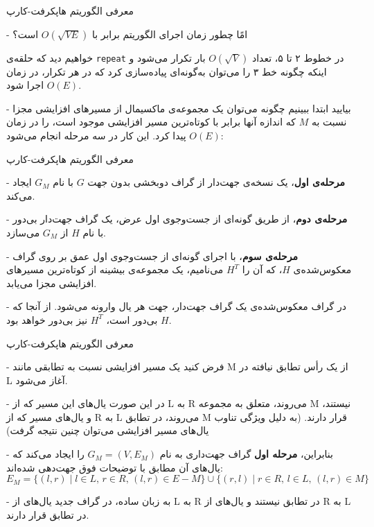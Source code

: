 \begin{itemframe}{‌معرفی الگوریتم هاپکرفت-کارپ}
\item[-]
امًا چطور زمان اجرای الگوریتم برابر با $O(\sqrt{V E})$ است؟

خواهیم دید که حلقه‌ی \texttt{repeat} در خطوط ۲ تا ۵، تعداد $O(\sqrt{V})$ بار تکرار می‌شود و اینکه چگونه خط ۳ را می‌توان به‌گونه‌ای پیاده‌سازی کرد که در هر تکرار، در زمان $O(E)$ اجرا شود.
\item[-]
بیایید ابتدا ببینیم چگونه می‌توان یک مجموعه‌ی ماکسیمال از مسیرهای افزایشی مجزا نسبت به $M$ که اندازه آنها برابر با کوتاه‌ترین مسیر افزایشی موجود است، را در زمان $O(E)$ پیدا کرد. این کار در سه مرحله انجام می‌شود:

\end{itemframe}


\begin{itemframe}{‌معرفی الگوریتم هاپکرفت-کارپ}
\item[-]
\textbf{مرحله‌ی اول}،
یک نسخه‌ی جهت‌دار از گراف دوبخشی بدون جهت $G$ با نام $G_M$ ایجاد می‌کند.
\item[-]
\textbf{مرحله‌ی دوم}،
از طریق گونه‌ای از جست‌وجوی اول عرض، یک گراف جهت‌دار بی‌دور با نام $H$ از $G_M$ می‌سازد.
\item[-]
\textbf{مرحله‌ی سوم}،
با اجرای گونه‌ای از جست‌وجوی اول عمق بر روی گراف معکوس‌شده‌ی $H$، که آن را $H^T$ می‌نامیم، یک مجموعه‌ی بیشینه از کوتاه‌ترین مسیرهای افزایشی مجزا می‌یابد.
\item[-]
در گراف معکوس‌شده‌ی یک گراف جهت‌دار، جهت هر یال وارونه می‌شود. از آنجا که $H$ بی‌دور است، $H^T$ نیز بی‌دور خواهد بود.
\end{itemframe}


\begin{itemframe}{‌معرفی الگوریتم هاپکرفت-کارپ}
\item[-]
فرض کنید یک مسیر افزایشی نسبت به تطابقی مانند M از یک رأس تطابق نیافته در L آغاز می‌شود.
\item[-]
در این صورت یال‌های این مسیر که از L به R می‌روند، متعلق به مجموعه M نیستند، و یال‌های مسیر که از R به L می‌روند، در تطابق M قرار دارند. (به دلیل ویژگی تناوب یال‌های مسیر افزایشی می‌توان چنین نتیجه گرفت)
\item[-]
بنابراین، \textbf{مرحله اول} گراف جهت‌داری به نام
$G_M = (V, E_M)$
را ایجاد می‌کند که یال‌های آن مطابق با توضیحات فوق جهت‌دهی شده‌اند:
$$
E_M = \{ (l, r) \mid l \in L,\, r \in R,\, (l, r) \in E - M \} \cup \{ (r, l) \mid r \in R,\, l \in L,\, (l, r) \in M \}
$$

\item[-]
به زبان ساده، در گراف جدید یال‌های از L به R در تطابق نیستند و یال‌های از R به L در تطابق قرار دارند.
\end{itemframe}


